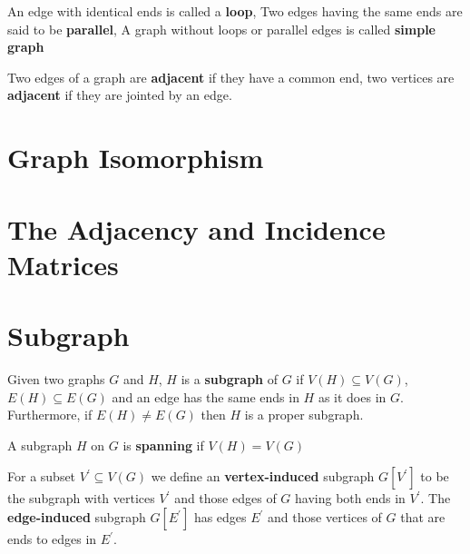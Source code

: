 			\begin{definition}
				An edge with identical ends is called a \textbf{loop}, Two edges having the same ends are said to be \textbf{parallel}, A graph without loops or parallel edges is called \textbf{simple graph}
			\end{definition}

			\begin{definition}[Adjacent]
				Two edges of a graph are \textbf{adjacent} if they have a common end, two vertices are \textbf{adjacent} if they are jointed by an edge.
			\end{definition}

		\section{Graph Isomorphism}

		\section{The Adjacency and Incidence Matrices}

		\section{Subgraph}
			\begin{definition}[Subgraph]
				Given two graphs $G$ and $H$, $H$ is a \textbf{subgraph} of $G$ if $V(H)\subseteq V(G)$, $E(H)\subseteq E(G)$ and an edge has the same ends in $H$ as it does in $G$. Furthermore, if $E(H)\neq E(G)$ then $H$ is a proper subgraph.
			\end{definition}
			
			\begin{definition}[Spanning]
				A subgraph $H$ on $G$ is \textbf{spanning} if $V(H) = V(G)$
			\end{definition}

			\begin{definition}
				For a subset $V^{'}\subseteq V(G)$ we define an \textbf{vertex-induced} subgraph $G[V^{'}]$ to be the subgraph with vertices $V^{'}$ and those edges of $G$ having both ends in $V^{'}$. The \textbf{edge-induced} subgraph $G[E^{'}]$ has edges $E^{'}$ and those vertices of $G$ that are ends to edges in $E^{'}$.
			\end{definition}



